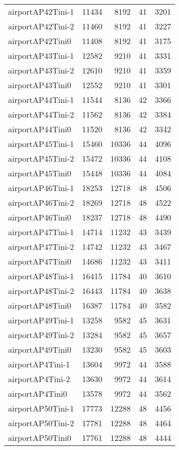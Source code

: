 \begin{longtable}{lrrrr}
airportAP42Tini-1 & 11434 & 8192 & 41 & 3201 \\
airportAP42Tini-2 & 11460 & 8192 & 41 & 3227 \\
airportAP42Tini0 & 11408 & 8192 & 41 & 3175 \\
airportAP43Tini-1 & 12582 & 9210 & 41 & 3331 \\
airportAP43Tini-2 & 12610 & 9210 & 41 & 3359 \\
airportAP43Tini0 & 12552 & 9210 & 41 & 3301 \\
airportAP44Tini-1 & 11544 & 8136 & 42 & 3366 \\
airportAP44Tini-2 & 11562 & 8136 & 42 & 3384 \\
airportAP44Tini0 & 11520 & 8136 & 42 & 3342 \\
airportAP45Tini-1 & 15460 & 10336 & 44 & 4096 \\
airportAP45Tini-2 & 15472 & 10336 & 44 & 4108 \\
airportAP45Tini0 & 15448 & 10336 & 44 & 4084 \\
airportAP46Tini-1 & 18253 & 12718 & 48 & 4506 \\
airportAP46Tini-2 & 18269 & 12718 & 48 & 4522 \\
airportAP46Tini0 & 18237 & 12718 & 48 & 4490 \\
airportAP47Tini-1 & 14714 & 11232 & 43 & 3439 \\
airportAP47Tini-2 & 14742 & 11232 & 43 & 3467 \\
airportAP47Tini0 & 14686 & 11232 & 43 & 3411 \\
airportAP48Tini-1 & 16415 & 11784 & 40 & 3610 \\
airportAP48Tini-2 & 16443 & 11784 & 40 & 3638 \\
airportAP48Tini0 & 16387 & 11784 & 40 & 3582 \\
airportAP49Tini-1 & 13258 & 9582 & 45 & 3631 \\
airportAP49Tini-2 & 13284 & 9582 & 45 & 3657 \\
airportAP49Tini0 & 13230 & 9582 & 45 & 3603 \\
airportAP4Tini-1 & 13604 & 9972 & 44 & 3588 \\
airportAP4Tini-2 & 13630 & 9972 & 44 & 3614 \\
airportAP4Tini0 & 13578 & 9972 & 44 & 3562 \\
airportAP50Tini-1 & 17773 & 12288 & 48 & 4456 \\
airportAP50Tini-2 & 17781 & 12288 & 48 & 4464 \\
airportAP50Tini0 & 17761 & 12288 & 48 & 4444 \\

\end{longtable}
